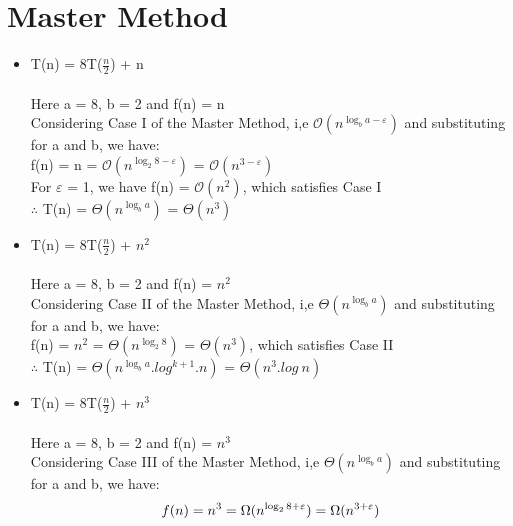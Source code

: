 \documentclass{article}
\begin{document}
\section{Master Method}

\begin{itemize}
\item T(n) = 8T($\frac{n}{2}$) + n \\ \\
  Here a = 8, b = 2 and f(n) = n \\
  Considering Case I of the Master Method, i,e $\mathcal{O}(n^{\log_b {a} - \varepsilon})$ and substituting for a and b, we have: \\

  f(n) = n = $\mathcal{O}(n^{\log_2 {8} - \varepsilon})$ =  $\mathcal{O}(n^{3 - \varepsilon})$ \\

  For $\varepsilon$ = 1, we have f(n) = $\mathcal{O}(n^{2})$, which satisfies Case I \\

  $\therefore$ T(n) = $\Theta(n^{\log_b {a}})$ = $\Theta(n^{3})$



\item T(n) = 8T($\frac{n}{2}$) + $n^{2}$ \\ \\
  Here a = 8, b = 2 and f(n) = $n^{2}$ \\
  Considering Case II of the Master Method, i,e $\Theta(n^{\log_b {a}})$ and substituting for a and b, we have: \\

  f(n) = $n^{2}$ = $\Theta(n^{\log_2 {8}})$ =  $\Theta(n^{3})$, which satisfies Case II \\

  $\therefore$ T(n) = $\Theta(n^{\log_b {a}} . log^{k+1} .n)$ = $\Theta(n^{3}.log\ n)$

  
\item T(n) = 8T($\frac{n}{2}$) + $n^{3}$ \\ \\

  Here a = 8, b = 2 and f(n) = $n^{3}$ \\
  Considering Case III of the Master Method, i,e $\Theta(n^{\log_b {a}})$ and substituting for a and b, we have: \\

  \begin{equation}
    f(n) = n^{3} = \Omega(n^{\log_2 {8} + \varepsilon}) =  \Omega(n^{3 + \varepsilon})   \\
  \end{equation}


\end{itemize}
\end{document}
